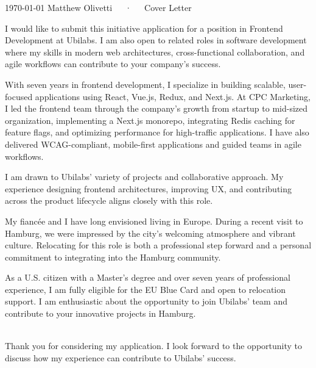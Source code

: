 \documentclass[11pt, a4paper]{awesome-cv}
\begin{document}
\makecvheader[C]

\makecvfooter
  {\today}
  {Matthew Olivetti~~~·~~~Cover Letter}
  {}

\makelettertitle

\begin{cvletter}

I would like to submit this initiative application for a position in Frontend Development at Ubilabs. I am also open to related roles in software development where my skills in modern web architectures, cross-functional collaboration, and agile workflows can contribute to your company's success.

With seven years in frontend development, I specialize in building scalable, user-focused applications using React, Vue.js, Redux, and Next.js. At CPC Marketing, I led the frontend team through the company's growth from startup to mid-sized organization, implementing a Next.js monorepo, integrating Redis caching for feature flags, and optimizing performance for high-traffic applications. I have also delivered WCAG-compliant, mobile-first applications and guided teams in agile workflows.

I am drawn to Ubilabs' variety of projects and collaborative approach. My experience designing frontend architectures, improving UX, and contributing across the product lifecycle aligns closely with this role.

My fiancée and I have long envisioned living in Europe. During a recent visit to Hamburg, we were impressed by the city's welcoming atmosphere and vibrant culture. Relocating for this role is both a professional step forward and a personal commitment to integrating into the Hamburg community.


As a U.S. citizen with a Master's degree and over seven years of professional experience, I am fully eligible for the EU Blue Card and open to relocation support. I am enthusiastic about the opportunity to join Ubilabs' team and contribute to your innovative projects in Hamburg.

\color{gray}\vhrulefill{0.5pt}\\

Thank you for considering my application. I look forward to the opportunity to discuss how my experience can contribute to Ubilabs' success.
\end{cvletter}


\makeletterclosing
\end{document}
